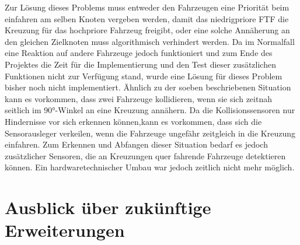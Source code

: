 		Zur Lösung dieses Problems muss entweder den Fahrzeugen eine Priorität beim einfahren am selben Knoten vergeben werden, damit das niedrigpriore \ac{FTF} die Kreuzung für das hochpriore Fahrzeug freigibt, oder eine solche Annäherung an den gleichen Zielknoten muss algorithmisch verhindert werden. Da im Normalfall eine Reaktion auf andere Fahrzeuge jedoch funktioniert und zum Ende des Projektes die Zeit für die Implementierung und den Test dieser zusätzlichen Funktionen nicht zur Verfügung stand, wurde eine Lösung für dieses Problem bisher noch nicht implementiert. 
		Ähnlich zu der soeben beschriebenen Situation kann es vorkommen, dass zwei Fahrzeuge kollidieren, wenn sie sich zeitnah seitlich im 90°-Winkel an eine Kreuzung annähern. Da die Kollisionssensoren nur Hindernisse vor sich erkennen können,kann es vorkommen, dass sich die Sensorausleger verkeilen, wenn die Fahrzeuge ungefähr zeitgleich in die Kreuzung einfahren. Zum Erkennen und Abfangen dieser Situation bedarf es jedoch zusätzlicher Sensoren, die an Kreuzungen quer fahrende Fahrzeuge detektieren können. Ein hardwaretechnischer Umbau war jedoch zeitlich nicht mehr möglich.
	
\section{Ausblick über zukünftige Erweiterungen}
	

